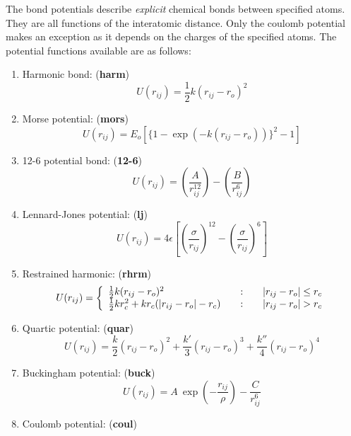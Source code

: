 The bond potentials describe {\em explicit}
chemical bonds between specified atoms.  They are all
functions of the interatomic distance.  Only the coulomb potential
makes an exception as it depends on the charges of the specified
atoms.  The potential functions available are as follows:
\begin{enumerate}
\item Harmonic bond:  ({\bf harm})
\begin{equation}
U(r_{ij}) = \frac{1}{2} k (r_{ij}-r_{o})^{2}
\end{equation}
\item Morse potential:  ({\bf mors})
\begin{equation}
U(r_{ij}) = E_{o} [\{1-\exp(-k(r_{ij}-r_{o}))\}^{2}-1]
\end{equation}
\item 12-6 potential bond:  ({\bf 12-6})
\begin{equation}
U(r_{ij}) = \left(\frac{A}{r_{ij}^{12}}\right)-\left(\frac{B}{r_{ij}^{6}}\right)
\end{equation}
\item Lennard-Jones potential:  ({\bf lj})
\begin{equation}
U(r_{ij}) = 4\epsilon\left[\left
(\frac{\sigma}{r_{ij}}\right)^{12}-\left(\frac{\sigma}{r_{ij}}\right)^{6}\right]
\end{equation}
\item Restrained harmonic:  ({\bf rhrm})
\begin{equation}
U(r_{ij}) = \left\{ \begin{array} {l@{\qquad:\qquad}l}
\frac{1}{2}k(r_{ij}-r_{o})^{2} & |r_{ij}-r_{o}|\le r_{c} \\
\frac{1}{2}kr_{c}^{2}+kr_{c}(|r_{ij}-r_{o}|-r_{c}) & |r_{ij}-r_{o}| > r_{c}
\end{array} \right.
\end{equation}
\item Quartic potential:  ({\bf quar})
\begin{equation}
U(r_{ij}) = \frac{k}{2}(r_{ij}-r_{o})^{2}+\frac{k'}{3}(r_{ij}-r_{o})^{3}+\frac{k''}{4}(r_{ij}-r_{o})^{4}
\end{equation}
\item Buckingham potential:  ({\bf buck})
\begin{equation}
U(r_{ij}) = A~\exp\left(-\frac{r_{ij}}{\rho}\right)-\frac{C}{r_{ij}^{6}}
\end{equation}
\item Coulomb potential:  ({\bf coul})
\begin{equation}

\end{equation}
\end{enumerate}
